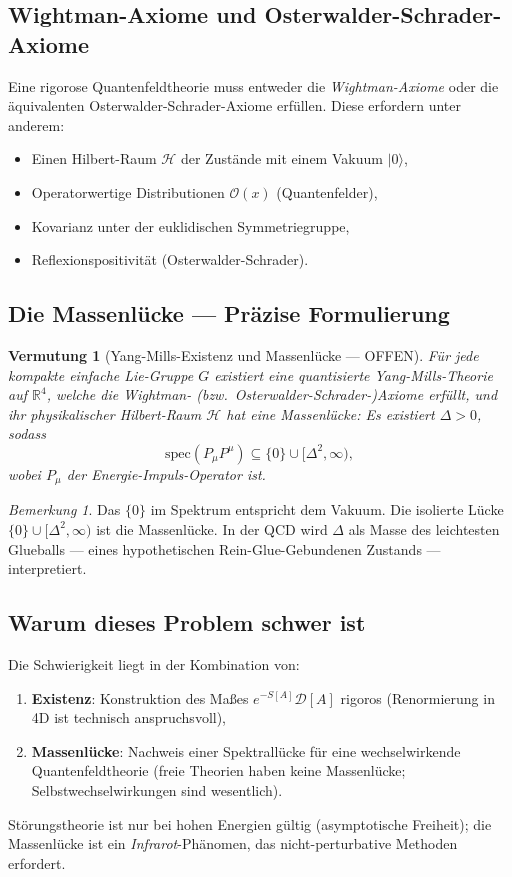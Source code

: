 \documentclass[12pt,a4paper]{amsart}
\newtheorem{conjecture}{Vermutung}
\theoremstyle{definition}
\theoremstyle{remark}
\newtheorem{remark}[theorem]{Bemerkung}
\begin{document}
\subsection{Wightman-Axiome und Osterwalder-Schrader-Axiome}

Eine rigorose Quantenfeldtheorie muss entweder die \emph{Wightman-Axiome}
\cite{StreaterWightman1964} oder die äquivalenten Osterwalder-Schrader-Axiome erfüllen.
Diese erfordern unter anderem:
\begin{itemize}[noitemsep]
  \item Einen Hilbert-Raum $\mathcal{H}$ der Zustände mit einem Vakuum $|0\rangle$,
  \item Operatorwertige Distributionen $\mathcal{O}(x)$ (Quantenfelder),
  \item Kovarianz unter der euklidischen Symmetriegruppe,
  \item Reflexionspositivität (Osterwalder-Schrader).
\end{itemize}

\subsection{Die Massenlücke — Präzise Formulierung}

\begin{conjecture}[Yang-Mills-Existenz und Massenlücke — OFFEN]
\label{verm:massluecke-praezise}
Für jede kompakte einfache Lie-Gruppe $G$ existiert eine quantisierte Yang-Mills-Theorie
auf $\mathbb{R}^4$, welche die Wightman- (bzw.\ Osterwalder-Schrader-)Axiome erfüllt, und
ihr physikalischer Hilbert-Raum $\mathcal{H}$ hat eine \emph{Massenlücke}: Es existiert
$\Delta > 0$, sodass
\[
  \mathrm{spec}(P_\mu P^\mu) \subseteq \{0\} \cup [\Delta^2, \infty),
\]
wobei $P_\mu$ der Energie-Impuls-Operator ist.
\end{conjecture}

\begin{remark}
Das $\{0\}$ im Spektrum entspricht dem Vakuum. Die isolierte Lücke $\{0\} \cup [\Delta^2, \infty)$
ist die Massenlücke. In der QCD wird $\Delta$ als Masse des leichtesten Glueballs —
eines hypothetischen Rein-Glue-Gebundenen Zustands — interpretiert.
\end{remark}

\subsection{Warum dieses Problem schwer ist}

Die Schwierigkeit liegt in der Kombination von:
\begin{enumerate}[noitemsep]
  \item \textbf{Existenz}: Konstruktion des Maßes $e^{-S[A]} \mathcal{D}[A]$ rigoros
    (Renormierung in 4D ist technisch anspruchsvoll),
  \item \textbf{Massenlücke}: Nachweis einer Spektrallücke für eine wechselwirkende
    Quantenfeldtheorie (freie Theorien haben keine Massenlücke; Selbstwechselwirkungen
    sind wesentlich).
\end{enumerate}
Störungstheorie ist nur bei hohen Energien gültig (asymptotische Freiheit); die
Massenlücke ist ein \emph{Infrarot}-Phänomen, das nicht-perturbative Methoden erfordert.
\end{document}
